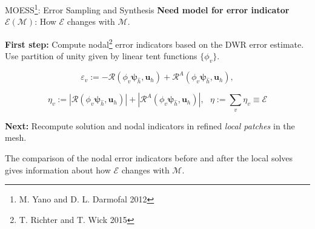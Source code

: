 \documentclass{beamer}
\newcounter{sectionframecount}
\begin{document}
\begin{frame}[t]{MOESS\footnote{M. Yano and D. L. Darmofal 2012}: Error Sampling and Synthesis}
\vspace{-5pt}
\textbf{Need model for error indicator $\mathcal{E}(\mathcal{M})$}: How $\mathcal{E}$ changes with $\mathcal{M}$.

{
\vspace{10pt}
\textbf{First step:} Compute nodal\footnote{T. Richter and T. Wick 2015} error indicators based on the DWR error estimate. Use partition of unity given by linear tent functions $\{\phi_v\}$.
}

{
\begin{equation}
  \varepsilon_v := -\mathcal{R}(\phi_v \boldsymbol{\psi}_{\hat{h}},\boldsymbol{u}_h) + \mathcal{R}^A(\phi_v\boldsymbol{\psi}_{\hat{h}},\boldsymbol{u}_h),
  \label{e:corrected_dwr_nodal}
\end{equation}

\begin{equation}
  \eta_v := |\mathcal{R}(\phi_v \boldsymbol{\psi}_{\hat{h}},\boldsymbol{u}_h)| + |\mathcal{R}^A(\phi_v\boldsymbol{\psi}_{\hat{h}},\boldsymbol{u}_h)|,~~~ \eta := \sum_{v} \eta_v \equiv \mathcal{E}
  \label{e:corrected_dwr_nodal}
\end{equation}
}

{
\textbf{Next:} Recompute solution and nodal indicators in refined \textit{local patches} in the mesh.

\vspace{5pt}
The comparison of the nodal error indicators before and after the local solves gives information about how $\mathcal{E}$ changes with $\mathcal{M}$.
}
\end{frame}

\end{document}
